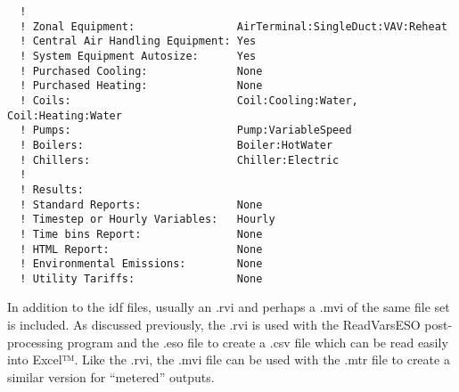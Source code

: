 \begin{lstlisting}
  !
  ! Zonal Equipment:                AirTerminal:SingleDuct:VAV:Reheat
  ! Central Air Handling Equipment: Yes
  ! System Equipment Autosize:      Yes
  ! Purchased Cooling:              None
  ! Purchased Heating:              None
  ! Coils:                          Coil:Cooling:Water, Coil:Heating:Water
  ! Pumps:                          Pump:VariableSpeed
  ! Boilers:                        Boiler:HotWater
  ! Chillers:                       Chiller:Electric
  !
  ! Results:
  ! Standard Reports:               None
  ! Timestep or Hourly Variables:   Hourly
  ! Time bins Report:               None
  ! HTML Report:                    None
  ! Environmental Emissions:        None
  ! Utility Tariffs:                None
\end{lstlisting}

In addition to the idf files, usually an .rvi and perhaps a .mvi of the same file set is included. As discussed previously, the .rvi is used with the ReadVarsESO post-processing program and the .eso file to create a .csv file which can be read easily into Excel™. Like the .rvi, the .mvi file can be used with the .mtr file to create a similar version for ``metered'' outputs.
